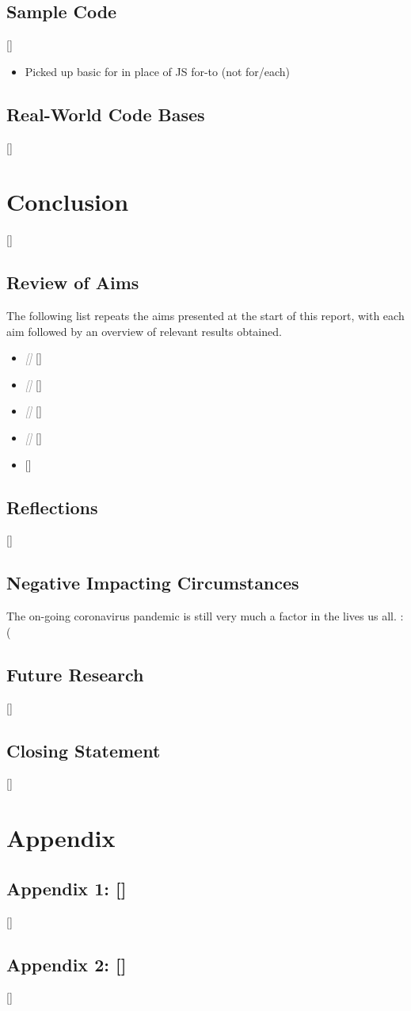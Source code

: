 \documentclass{article}
\begin{document}
    \subsection{Sample Code}
        []
        \begin{itemize}
            \item Picked up basic for in place of JS for-to (not for/each)
        \end{itemize}
    \subsection{Real-World Code Bases}
        []
\section{Conclusion}
\label{sec:conclusion}
    []
    \subsection{Review of Aims}
        The following list repeats the aims presented at the start of this report, with each aim followed by an overview of relevant results obtained.
        \begin{itemize}
            \item \textcolor{gray}{\textit{[]}}
                []
            \item \textcolor{gray}{\textit{[]}}
                []
            \item \textcolor{gray}{\textit{[]}}
                []
            \item \textcolor{gray}{\textit{[]}}
                []
            \item \textcolor{gray}{\textit{}}
                []
        \end{itemize}
    \subsection{Reflections}
        []
    \subsection{Negative Impacting Circumstances}
        The on-going coronavirus pandemic is still very much a factor in the lives us all. :(
    \subsection{Future Research}
        []
    \subsection{Closing Statement}
        []

\newpage
\section*{Appendix}
    \subsection*{Appendix 1: []}
        []
    \subsection*{Appendix 2: []}
        []
\end{document}
